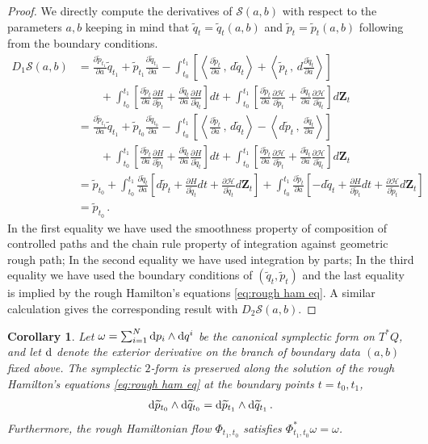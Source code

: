 \documentclass[11pt, oneside]{article}
\numberwithin{equation}{section}
\newtheorem{corollary}[lemma]{Corollary}
\theoremstyle{definition}
\newcommand{\wt}[1]{\widetilde{#1}}
\newcommand{\mc}[1]{\mathcal{#1}}
\newcommand{\mcal}[1]{\mc{#1}}
\newcommand{\scp}[2]{{\left\langle {#1}\, , \, {#2}\right\rangle}}
\def\p{{\partial}}
\def\rmd{{\rm d}}
\def\p{\partial}
\begin{document}
\begin{proof}
    We directly compute the derivatives of $\mcal{S}(a,b)$ with respect to the parameters $a,b$ keeping in mind that $\wt{q}_t = \wt{q}_t(a,b)$ and $\wt{p}_t = \wt{p}_t(a,b)$ following from the boundary conditions. 
    \begin{align*}
        D_1 \mcal{S}(a,b) &= \frac{\p \wt{p}_{t_1}}{\p a}\wt{q}_{t_1} + \wt{p}_{t_1}\frac{\p \wt{q}_{t_1}}{\p a} - \int_{t_0}^{t_1}\left[\scp{\frac{\p \wt{p}_t}{\p a}}{d \wt{q}_t} + \scp{\wt{p}_t}{d \frac{\p \wt{q}_t}{\p a}} \right]\\
        & \qquad + \int_{t_0}^{t_1} \left[\frac{\p \wt{p}_t}{\p a} \frac{\p H}{\p \wt{p}_t} + \frac{\p \wt{q}_t}{\p a} \frac{\p H}{\p \wt{q}_t}\right]dt + \int_{t_0}^{t_1} \left[\frac{\p \wt{p}_t}{\p a}\frac{\p \mcal{H}}{\p \wt{p}_t} + \frac{\p \wt{q}_t}{\p a}\frac{\p \mcal{H}}{\p \wt{q}_t}\right]d\mathbf{Z}_t\\
        &= \frac{\p \wt{p}_{t_1}}{\p a}\wt{q}_{t_1} + \wt{p}_{t_0}\frac{\p \wt{q}_{t_0}}{\p a} - \int_{t_0}^{t_1}\left[\scp{\frac{\p \wt{p}_t}{\p a}}{d \wt{q}_t} - \scp{d \wt{p}_t}{\frac{\p \wt{q}_t}{\p a}}\right] \\
        & \qquad + \int_{t_0}^{t_1} \left[\frac{\p \wt{p}_t}{\p a} \frac{\p H}{\p \wt{p}_t} + \frac{\p \wt{q}_t}{\p a} \frac{\p H}{\p \wt{q}_t}\right]dt + \int_{t_0}^{t_1} \left[\frac{\p \wt{p}_t}{\p a}\frac{\p \mcal{H}}{\p \wt{p}_t} + \frac{\p \wt{q}_t}{\p a}\frac{\p \mcal{H}}{\p \wt{q}_t}\right]d\mathbf{Z}_t\\
        &= \wt{p}_{t_0} + \int_{t_0}^{t_1}\frac{\p \wt{q}_t}{\p a} \left[d \wt{p}_t + \frac{\p H}{\p \wt{q}_t}dt + \frac{\p \mcal{H}}{\p \wt{q}_t}d\mathbf{Z}_t\right] + \int_{t_0}^{t_1} \frac{\p \wt{p}_t}{\p a}\left[- d \wt{q}_t + \frac{\p H}{\p \wt{p}_t}dt + \frac{\p \mcal{H}}{\p \wt{p}_t}d\mathbf{Z}_t\right]\\
        &= \wt{p}_{t_0}\,.
    \end{align*}
    In the first equality we have used the smoothness property of composition of controlled paths and the chain rule property of integration against geometric rough path; In the second equality we have used integration by parts; In the third equality we have used the boundary conditions of $(\wt{q}_t, \wt{p}_t)$ and the last equality is implied by the rough Hamilton's equations \eqref{eq:rough ham eq}. A similar calculation gives the corresponding result with $D_2 \mcal{S}(a,b)$.
\end{proof}
\begin{corollary}\label{cor:symp form conservation}
Let $\omega = \sum_{i=1}^N \rmd p_i \wedge \rmd q^i$ be the canonical symplectic form on $T^*Q$, and let $\rmd$ denote the exterior derivative on the branch of boundary data $(a,b)$ fixed above. The symplectic $2$-form is preserved along the solution of the rough Hamilton's equations \eqref{eq:rough ham eq} at the boundary points $t = t_0, t_1$,
\begin{align}
    \rmd \wt{p}_{t_0} \wedge \rmd \wt{q}_{t_0} = \rmd \wt{p}_{t_1} \wedge \rmd \wt{q}_{t_1}\,.
\end{align}
Furthermore, the rough Hamiltonian flow $\Phi_{t_1,t_0}$ satisfies $\Phi^*_{t_1,t_0}\omega = \omega$.
\end{corollary}
\end{document}
